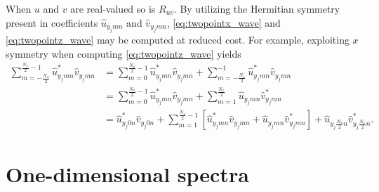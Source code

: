 \documentclass[letterpaper,11pt,nointlimits,reqno]{amsart}
\begin{document}
When $u$ and $v$ are real-valued so is $R_{uv}$.  By utilizing the Hermitian
symmetry present in coefficients $\hat{u}_{y_j m n}$ and $\hat{v}_{y_j m n}$,
\eqref{eq:twopointx_wave} and \eqref{eq:twopointz_wave} may be computed at
reduced cost.  For example, exploiting $x$ symmetry when computing
\eqref{eq:twopointz_wave} yields
%
\small
\begin{align}
  \sum_{m=-\frac{N_x}{2}}^{\frac{N_x}{2}-1}
  \hat{u}^\ast_{y_j m n} \hat{v}_{y_j m n}
&=
    \sum_{m=0}^{\frac{N_x}{2}-1}
    \hat{u}^\ast_{y_j m n} \hat{v}_{y_j m n}
    +
    \sum_{m=-\frac{N_x}{2}}^{-1}
    \hat{u}^\ast_{y_j m n} \hat{v}_{y_j m n}
\\ &=
    \sum_{m=0}^{\frac{N_x}{2}-1}
    \hat{u}^\ast_{y_j m n} \hat{v}_{y_j m n}
    +
    \sum_{m=1}^{\frac{N_x}{2}}
    \hat{u}_{y_j m n} \hat{v}^\ast_{y_j m n}
\\ &=
    \hat{u}^\ast_{y_j 0 n} \hat{v}_{y_j 0 n}
    +
    \sum_{m=1}^{\frac{N_x}{2}-1}
    \left[
      \hat{u}^\ast_{y_j m n} \hat{v}_{y_j m n}
      +
      \hat{u}_{y_j m n} \hat{v}^\ast_{y_j m n}
    \right]
    +
    \hat{u}_{y_j \frac{N_x}{2} n} \hat{v}^\ast_{y_j \frac{N_x}{2} n}.
\end{align}
\normalsize

\section{One-dimensional spectra
         \citep[\textsection{}6.5]{Pope2000Turbulent}}
\end{document}
